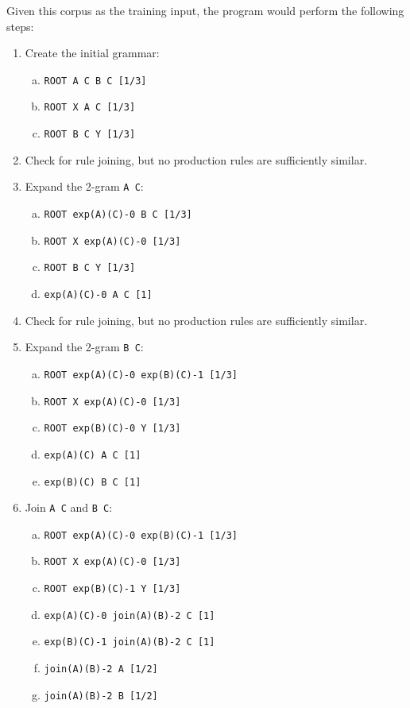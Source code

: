 \documentclass[paper=a4, fontsize=11pt]{scrartcl} %
\numberwithin{equation}{section} %
\numberwithin{figure}{section} %
\numberwithin{table}{section} %
\begin{document}
Given this corpus as the training input, the program would perform the following steps:
\begin{enumerate}[1.]
\item Create the initial grammar:
\begin{enumerate}[(a)]
\item \texttt{ROOT \textrightarrow A C B C [1/3]}
\item \texttt{ROOT \textrightarrow X A C [1/3]}
\item \texttt{ROOT \textrightarrow B C Y [1/3]}
\end{enumerate}

\item Check for rule joining, but no production rules are sufficiently similar.

\item Expand the 2-gram \texttt{A C}:
\begin{enumerate}[(a)]
\item \texttt{ROOT \textrightarrow exp(A)(C)-0 B C [1/3]}
\item \texttt{ROOT \textrightarrow X exp(A)(C)-0 [1/3]}
\item \texttt{ROOT \textrightarrow B C Y [1/3]}
\item \texttt{exp(A)(C)-0 \textrightarrow A C  [1]}
\end{enumerate}

\item Check for rule joining, but no production rules are sufficiently similar.

\item Expand the 2-gram \texttt{B C}:
\begin{enumerate}[(a)]
\item \texttt{ROOT \textrightarrow exp(A)(C)-0 exp(B)(C)-1 [1/3]}
\item \texttt{ROOT \textrightarrow X exp(A)(C)-0 [1/3]}
\item \texttt{ROOT \textrightarrow exp(B)(C)-0 Y [1/3]}
\item \texttt{exp(A)(C) \textrightarrow A C  [1]}
\item \texttt{exp(B)(C) \textrightarrow B C  [1]}
\end{enumerate}

\item Join \texttt{A C} and \texttt{B C}:
\begin{enumerate}[(a)]
\item \texttt{ROOT \textrightarrow exp(A)(C)-0 exp(B)(C)-1 [1/3]}
\item \texttt{ROOT \textrightarrow X exp(A)(C)-0 [1/3]}
\item \texttt{ROOT \textrightarrow exp(B)(C)-1 Y [1/3]}
\item \texttt{exp(A)(C)-0 \textrightarrow join(A)(B)-2 C  [1]}
\item \texttt{exp(B)(C)-1 \textrightarrow join(A)(B)-2 C  [1]}
\item \texttt{join(A)(B)-2 \textrightarrow A  [1/2]}
\item \texttt{join(A)(B)-2 \textrightarrow B  [1/2]}
\end{enumerate}


\end{enumerate}
\end{document}
